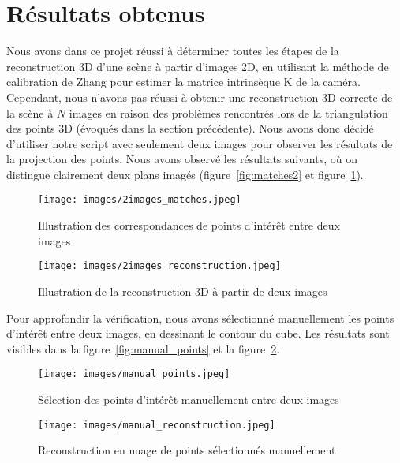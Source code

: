 \documentclass[12pt]{article}
\begin{document}
\section{Résultats obtenus}

Nous avons dans ce projet réussi à déterminer toutes les étapes de la reconstruction 3D d'une scène à partir d'images 2D, en utilisant la méthode de calibration de Zhang pour estimer la matrice intrinsèque K de la caméra.
Cependant, nous n'avons pas réussi à obtenir une reconstruction 3D correcte de la scène à $N$ images en raison des problèmes rencontrés lors de la triangulation des points 3D (évoqués dans la section précédente). 
\linebreak
Nous avons donc décidé d'utiliser notre script avec seulement deux images pour observer les résultats de la projection des points. Nous avons observé les résultats suivants, où on distingue clairement deux plans imagés (figure~\ref{fig:matches2} et figure~\ref{fig:reconstruction2}).

\begin{figure}[H]
    \centering
    \begin{minipage}[b]{0.45\textwidth}
        \centering
        \texttt{[image: images/2images\_matches.jpeg]}
        \caption{Illustration des correspondances de points d'intérêt entre deux images}
        \label{fig:matches2}
    \end{minipage}\hfill
    \begin{minipage}[b]{0.45\textwidth}
        \centering
        \texttt{[image: images/2images\_reconstruction.jpeg]}
        \caption{Illustration de la reconstruction 3D à partir de deux images}
        \label{fig:reconstruction2}
    \end{minipage}
\end{figure}

Pour approfondir la vérification, nous avons sélectionné manuellement les points d'intérêt entre deux images, en dessinant le contour du cube.
Les résultats sont visibles dans la figure~\ref{fig:manual_points} et la figure~\ref{fig:manual_reconstruction}.

\begin{figure}[H]
    \centering
    \begin{minipage}[b]{0.45\textwidth}
        \centering
        \texttt{[image: images/manual\_points.jpeg]}
        \caption{Sélection des points d'intérêt manuellement entre deux images}
        \label{fig:manual_points}
    \end{minipage}\hfill
    \begin{minipage}[b]{0.45\textwidth}
        \centering
        \texttt{[image: images/manual\_reconstruction.jpeg]}
        \caption{Reconstruction en nuage de points sélectionnés manuellement}
        \label{fig:manual_reconstruction}
    \end{minipage} 
\end{figure}
\end{document}
